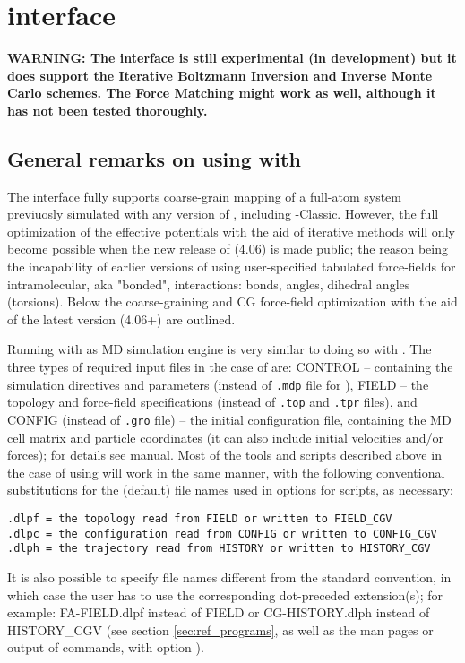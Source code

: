 \chapter{\dlpoly interface}
\label{sec:usage:dlpoly}
\textbf{WARNING: The \dlpoly interface is still experimental (in development)
but it does support the Iterative Boltzmann Inversion and Inverse Monte Carlo schemes. 
The Force Matching might work as well, although it has not been tested thoroughly.}

\section{General remarks on using \votca with \dlpoly}

The \dlpoly interface fully supports coarse-grain mapping of a full-atom system 
previuosly simulated with any version of \dlpoly, including \dlpoly-Classic. 
However, the full optimization of the effective potentials with the aid of iterative 
methods will only become possible when the new release of \dlpolyfour (4.06) is made 
public; the reason being the incapability of earlier \dlpoly versions of using 
user-specified tabulated force-fields for intramolecular, aka "bonded", interactions:
bonds, angles, dihedral angles (torsions). Below the coarse-graining and CG force-field 
optimization with the aid of the latest \dlpolyfour version (4.06+) are outlined. 

Running \votca with \dlpolyfour as MD simulation engine is very similar to doing so with \gromacs. 
The three types of required input files in the case of \dlpoly are: CONTROL -- containing 
the simulation directives and parameters (instead of \texttt{.mdp} file for \gromacs), 
FIELD -- the topology and force-field specifications (instead of \texttt{.top} and \texttt{.tpr} 
files), and CONFIG (instead of \texttt{.gro} file) -- the initial configuration file, 
containing the MD cell matrix and particle coordinates (it can also include initial velocities 
and/or forces); for details see \dlpolyfour manual. Most of the \votca tools and scripts described 
above in the case of using \gromacs will work in the same manner, with the following conventional  
substitutions for the (default) file names used in options for \votca scripts, as necessary: 
\begin{verbatim}
.dlpf = the topology read from FIELD or written to FIELD_CGV
.dlpc = the configuration read from CONFIG or written to CONFIG_CGV
.dlph = the trajectory read from HISTORY or written to HISTORY_CGV
\end{verbatim}
It is also possible to specify file names different from the standard \dlpoly convention, 
in which case the user has to use the corresponding dot-preceded extension(s); 
for example: FA-FIELD.dlpf instead of FIELD or CG-HISTORY.dlph instead of HISTORY\_CGV 
(see  section \ref{sec:ref_programs}, as well as the man pages or output of \votca commands, 
with option ). 


